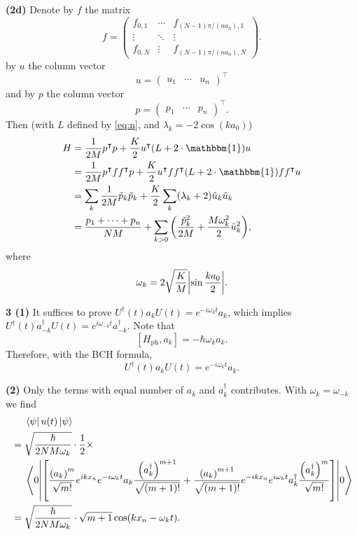\documentclass{article}
\makeatletter
\newcommand*{\shifttext}[1]{%
  \settowidth{\@tempdima}{#1}%
  \hspace{-\@tempdima}#1%
}
\newcommand{\plabel}[1]{%
\shifttext{\textbf{#1}\quad}%
}
\newcommand{\prule}{%
\begin{center}%
\hdashrule[0.5ex]{.99\linewidth}{1pt}{1pt 2.5pt}%
\end{center}%
}
\makeatother
\begin{document}
\plabel{(2d)}%
Denote by $f$ the matrix
\[ f = \begin{pmatrix}
    f_{0, 1} & \cdots & f_{(N-1)\pi/(n a_0), 1} \\
    \vdots & \ddots & \vdots \\
    f_{0, N} & \vdots & f_{(N-1)\pi/(n a_0), N}
\end{pmatrix}. \]
by $u$ the column vector
\[ u = \begin{pmatrix}
    u_1 & \cdots & u_n
\end{pmatrix}^\intercal \]
and by $p$ the column vector
\[ p = \begin{pmatrix}
    p_1 & \cdots & p_n
\end{pmatrix}^\intercal. \]
Then (with $L$ defined by \cref{eq:n}, and $\lambda_k = -2\cos(k a_0)$)
\begin{align*}
    H &= \frac{1}{2M} p^\intercal p + \frac{K}{2} u^\intercal(L + 2\cdot\mathbbm{1}) u \\
    &= \frac{1}{2M} p^\intercal f f^\intercal p + \frac{K}{2} u^\intercal f f^\intercal(L + 2\cdot\mathbbm{1}) f f^\intercal u \\
    &= \sum_k \frac{1}{2M} \tilde{p}_k \tilde{p}_k + \frac{K}{2} \sum_k (\lambda_k + 2) \tilde{u}_k \tilde{u}_k \\
    &= \frac{p_1 + \cdots + p_n}{NM} + \sum_{k>0} \qty(\frac{\tilde{p}_k^2}{2M} + \frac{M\omega_k^2}{2}\tilde{u}_k^2),
\end{align*}
where
\[ \omega_k = 2\sqrt{\frac{K}{M}}\abs{\sin \frac{ka_0}{2}}. \]

\prule
\plabel{3 (1)}%
It suffices to prove $U^\dagger(t) a_k U(t) = e^{-i\omega_k t} a_k$, which implies $U^\dagger(t) a^\dagger_{-k} U(t) = e^{i\omega_{-k} t} a^\dagger_{-k}$.
Note that
\[ [H_{\mathrm{ph}}, a_k] = -\hbar \omega_k a_k. \]
Therefore, with the BCH formula,
\[ U^\dagger(t) a_k U(t) = e^{-i \omega_k t} a_k. \]

\plabel{(2)}%
Only the terms with equal number of $a_k$ and $a^\dagger_k$ contributes. With $\omega_k = \omega_{-k}$ we find
\begin{align*}
    &\phantom{{}={}} \bra{\psi} u(t) \ket{\psi} \\ &= \sqrt{\frac{\hbar}{2NM\omega_k}} \cdot \frac{1}{2} \times \\
    &{\phantom{{}={}}} \ev**{\qty[ \frac{\qty(a_k)^m}{\sqrt{m!}} e^{ikx_n} e^{-i\omega_k t}a_k \frac{\qty(a^\dagger_k)^{m+1}}{\sqrt{(m+1)!}} + \frac{\qty(a_k)^{m+1}}{\sqrt{(m+1)!}} e^{-ikx_n} e^{i\omega_k t}a_k^\dagger \frac{\qty(a^\dagger_k)^m}{\sqrt{m!}} ]}{0} \\
    &= \sqrt{\frac{\hbar}{2NM\omega_k}} \cdot \sqrt{m+1} \cos(k x_n - \omega_k t).
\end{align*}
\end{document}
